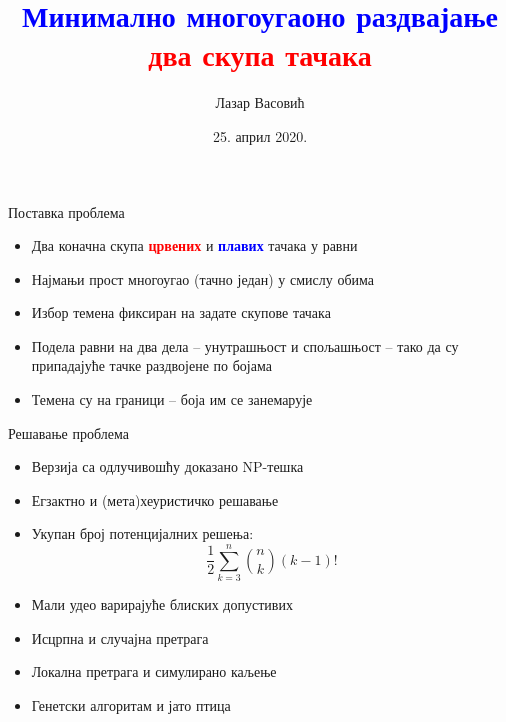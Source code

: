 \documentclass{beamer}
\title{\textbf{\textcolor{blue}{Минимално многоугаоно раздвајање} \textcolor{red}{два скупа тачака}}}
\author{Лазар Васовић}
\institute{Математички факултет, Универзитет у Београду\\\url{https://github.com/matfija/Minimalno-razdvajanje}}
\date{25. април 2020.}
\begin{document}
\frame{\titlepage}

\begin{frame}{Поставка проблема}
\begin{itemize}
\item Два коначна скупа \textbf{\textcolor{red}{црвених}} и \textbf{\textcolor{blue}{плавих}} тачака у равни

\item Најмањи прост многоугао (тачно један) у смислу обима

\item Избор темена фиксиран на задате скупове тачака

\item Подела равни на два дела -- унутрашњост и спољашњост -- тако да су припадајуће тачке раздвојене по бојама

\item Темена су на граници -- боја им се занемарује
\end{itemize}
\end{frame}

{
\begin{frame}
\end{frame}
}

\begin{frame}{Решавање проблема}
\begin{itemize}
\item Верзија са одлучивошћу доказано NP-тешка

\item Егзактно и (мета)хеуристичко решавање

\item Укупан број потенцијалних решења: $$\frac{1}{2} \sum_{k=3}^{n} {n \choose k} (k-1)!$$

\item Мали удео варирајуће блиских допустивих

\item Исцрпна и случајна претрага

\item Локална претрага и симулирано каљење

\item Генетски алгоритам и јато птица
\end{itemize}
\end{frame}
\end{document}
